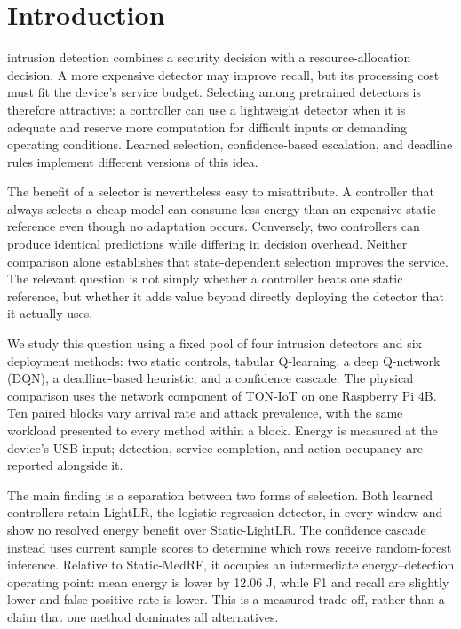 \documentclass[journal]{IEEEtran}
\begin{document}
\section{Introduction}\label{sec:introduction}
 intrusion detection combines a security decision with a resource-allocation decision. A more expensive detector may improve recall, but its processing cost must fit the device's service budget. Selecting among pretrained detectors is therefore attractive: a controller can use a lightweight detector when it is adequate and reserve more computation for difficult inputs or demanding operating conditions. Learned selection, confidence-based escalation, and deadline rules implement different versions of this idea.

The benefit of a selector is nevertheless easy to misattribute. A controller that always selects a cheap model can consume less energy than an expensive static reference even though no adaptation occurs. Conversely, two controllers can produce identical predictions while differing in decision overhead. Neither comparison alone establishes that state-dependent selection improves the service. The relevant question is not simply whether a controller beats one static reference, but whether it adds value beyond directly deploying the detector that it actually uses.

We study this question using a fixed pool of four intrusion detectors and six deployment methods: two static controls, tabular Q-learning, a deep Q-network (DQN), a deadline-based heuristic, and a confidence cascade. The physical comparison uses the network component of TON-IoT on one Raspberry Pi 4B. Ten paired blocks vary arrival rate and attack prevalence, with the same workload presented to every method within a block. Energy is measured at the device's USB input; detection, service completion, and action occupancy are reported alongside it.

The main finding is a separation between two forms of selection. Both learned controllers retain LightLR, the logistic-regression detector, in every window and show no resolved energy benefit over Static-LightLR. The confidence cascade instead uses current sample scores to determine which rows receive random-forest inference. Relative to Static-MedRF, it occupies an intermediate energy--detection operating point: mean energy is lower by 12.06 J, while F1 and recall are slightly lower and false-positive rate is lower. This is a measured trade-off, rather than a claim that one method dominates all alternatives.
\end{document}
